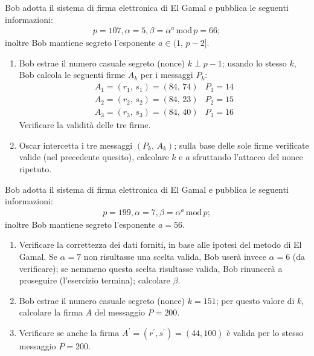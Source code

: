         Bob adotta il sistema di firma elettronica di El Gamal e pubblica le seguenti informazioni:
        \begin{gather*}
            p=107, \alpha = 5, \beta = \alpha^a\,\mathrm{mod}\,p=66
        ;\end{gather*}
        inoltre Bob mantiene segreto l'esponente $a\in (1,\,p-2]$.
        \begin{enumerate}
            \item Bob estrae il numero casuale segreto (nonce) $k\perp p-1$; usando lo stesso $k$, 
                Bob calcola le seguenti firme $A_k$ per i messaggi $P_k$:
                \[\begin{array}{ll}
                    A_1=(r_1,\,s_1)=(84,\,74) & P_1=14\\
                    A_2=(r_2,\,s_2)=(84,\,23) & P_2=15\\
                    A_3=(r_3,\,s_3)=(84,\,40) & P_3=16
                \end{array}\]
                Verificare la validità delle tre firme.
            \item Oscar intercetta i tre messaggi $(P_k,\,A_k)$; sulla base delle sole firme verificate valide 
                (nel precedente quesito), calcolare $k$ e $a$ sfruttando l'attacco del nonce ripetuto.
        \end{enumerate}

        Bob adotta il sistema di firma elettronica di El Gamal e pubblica le seguenti informazioni:
        \begin{gather*}
            p=199, \alpha = 7, \beta = \alpha^a\,\mathrm{mod}\,p
        ;\end{gather*}
        inoltre Bob mantiene segreto l'esponente $a=56$.
        \begin{enumerate}
            \item Verificare la correttezza dei dati forniti, in base alle ipotesi del metodo di El Gamal. 
                Se $\alpha=7$ non risultasse una scelta valida, Bob userà invece $\alpha=6$ (da verificare); 
                se nemmeno questa scelta risultasse valida, Bob rinuncerà a proseguire (l'esercizio termina); 
                calcolare $\beta$.
            \item Bob estrae il numero casuale segreto (nonce) $k=151$; per questo valore di $k$, calcolare 
                la firma $A$ del messaggio $P=200$.
            \item Verificare se anche la firma $A^{\prime}=(r^{\prime}, s^{\prime})=(44,100)$ è valida per 
                lo stesso messaggio $P=200$.
        \end{enumerate}

